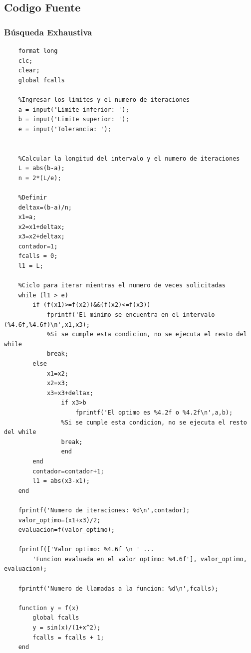 \documentclass[12pt,oneside]{book}
\begin{document}
\newpage
\subsection*{Codigo Fuente}
\subsubsection{Búsqueda Exhaustiva}
\begin{lstlisting}
	format long
	clc;
	clear;
	global fcalls
	
	%Ingresar los limites y el numero de iteraciones
	a = input('Limite inferior: ');
	b = input('Limite superior: ');
	e = input('Tolerancia: ');
	
	
	%Calcular la longitud del intervalo y el numero de iteraciones
	L = abs(b-a);
	n = 2*(L/e);
	
	%Definir
	deltax=(b-a)/n;
	x1=a;
	x2=x1+deltax;
	x3=x2+deltax;
	contador=1;
	fcalls = 0;
	l1 = L;
	
	%Ciclo para iterar mientras el numero de veces solicitadas
	while (l1 > e)
		if (f(x1)>=f(x2))&&(f(x2)<=f(x3))
			fprintf('El minimo se encuentra en el intervalo (%4.6f,%4.6f)\n',x1,x3);
			%Si se cumple esta condicion, no se ejecuta el resto del while
			break;
		else
			x1=x2;
			x2=x3;
			x3=x3+deltax;
				if x3>b
					fprintf('El optimo es %4.2f o %4.2f\n',a,b);
				%Si se cumple esta condicion, no se ejecuta el resto del while
				break;
				end
		end
		contador=contador+1;
		l1 = abs(x3-x1);
	end
	
	fprintf('Numero de iteraciones: %d\n',contador);
	valor_optimo=(x1+x3)/2;
	evaluacion=f(valor_optimo);
	
	fprintf(['Valor optimo: %4.6f \n ' ...
		'Funcion evaluada en el valor optimo: %4.6f'], valor_optimo, evaluacion);
	  
	fprintf('Numero de llamadas a la funcion: %d\n',fcalls);
	
	function y = f(x)
		global fcalls
		y = sin(x)/(1+x^2);
		fcalls = fcalls + 1;
	end
	\end{lstlisting}
\end{document}
